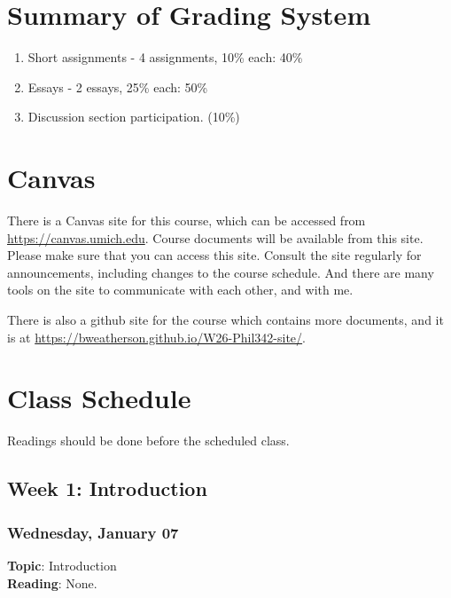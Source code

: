\documentclass[
  letterpaper,
  DIV=11,
  numbers=noendperiod]{scrartcl}
\providecommand{\tightlist}{%
  \setlength{\itemsep}{0pt}\setlength{\parskip}{0pt}}
\begin{document}
\section{Summary of Grading System}\label{summary-of-grading-system}

\begin{enumerate}
\def\labelenumi{\arabic{enumi}.}
\tightlist
\item
  Short assignments - 4 assignments, 10\% each: 40\%
\item
  Essays - 2 essays, 25\% each: 50\%
\item
  Discussion section participation. (10\%)
\end{enumerate}

\section{Canvas}\label{canvas}

There is a Canvas site for this course, which can be accessed from
\url{https://canvas.umich.edu}. Course documents will be available from
this site. Please make sure that you can access this site. Consult the
site regularly for announcements, including changes to the course
schedule. And there are many tools on the site to communicate with each
other, and with me.

There is also a github site for the course which contains more
documents, and it is at
\url{https://bweatherson.github.io/W26-Phil342-site/}.

\pagebreak

\section{Class Schedule}\label{class-schedule}

Readings should be done before the scheduled class.

\subsection{Week 1: Introduction}\label{week-1-introduction}

\subsubsection{Wednesday, January 07}\label{wednesday-january-07}

\textbf{Topic}: Introduction\\
\textbf{Reading}: None.
\end{document}
